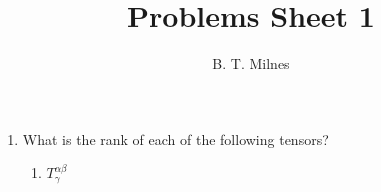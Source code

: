 \documentclass[10pt,a4paper]{article}
\author{B. T. Milnes}
\title{Problems Sheet 1}
\begin{document}

\begin{enumerate}
\item What is the rank of each of the following tensors?
\begin{enumerate}
\item $T^{\alpha\beta}_{\gamma}$
\end{enumerate}
\end{enumerate}
\end{document}
